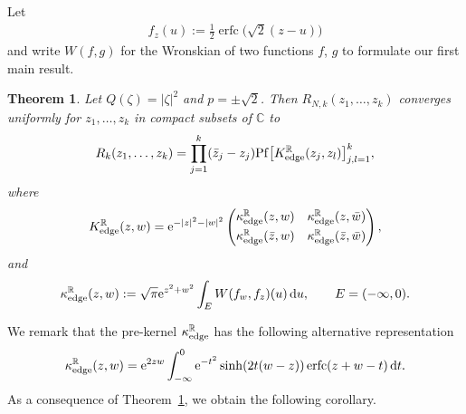 \documentclass[pdftex]{sigma}
\numberwithin{equation}{section}
\newtheorem{Theorem}{Theorem}[section]
\newcommand{\erfc}{\operatorname{erfc}}
\newcommand{\R}{{\mathbb R}}
\newcommand{\C}{{\mathbb C}}
\newcommand{\1}{\chi}
\newcommand{\Pf}{{\operatorname{Pf}}}
\begin{document}
Let
\begin{gather} \label{f_z(u)}
	f_z(u):=\tfrac12 \erfc\big( \sqrt{2}(z-u) \big)
\end{gather}
and write $W(f,g)$ for the Wronskian of two functions $f$, $g$ to formulate our first main result.

\begin{Theorem} \label{Thm_edge kernel}
	Let $Q(\zeta)=|\zeta|^2$ and $p=\pm \sqrt{2}$.
Then $R_{N,k}(z_1,\dots, z_k)$ converges uniformly for $z_1,\dots, z_k$ in compact subsets of $\C$ to
	\begin{gather*}
		R_k(z_1,\dots, z_k)= \prod_{j=1}^{k} ( \bar{z}_j-z_j ) \Pf \big[ K_{{\rm edge}}^{\R}(z_j,z_l) \big]_{ j,l=1 }^k,
	\end{gather*}
	where
	\begin{gather*} %
		K_{{\rm edge}}^\R(z,w)={\rm e}^{-|z|^2-|w|^2}
		\begin{pmatrix}
			\kappa_{{\rm edge}}^\R (z,w) & \kappa_{{\rm edge}}^\R (z,\bar{w})
			\vspace{1mm}\\
			\kappa_{{\rm edge}}^\R (\bar{z},w) & \kappa_{{\rm edge}}^\R (\bar{z},\bar{w})
		\end{pmatrix},
	\end{gather*}
	and
	\begin{gather} \label{kappa edge}
		\kappa_{{\rm edge}}^\R(z,w)
		:= \sqrt{\pi} {\rm e}^{z^2+w^2} \int_{E} W(f_w,f_z)(u) \, {\rm d}u, \qquad E=(-\infty,0).
	\end{gather}
\end{Theorem}

We remark that the pre-kernel $	\kappa_{{\rm edge}}^\R$ has the following alternative representation
\begin{gather*}
	\kappa_{{\rm edge}}^\R(z,w)={\rm e}^{2zw} \int_{-\infty}^{0} {\rm e}^{-t^2} \sinh( 2t(w-z) ) \erfc(z+w-t)\,{\rm d}t.
\end{gather*}
As a consequence of Theorem~\ref{Thm_edge kernel}, we obtain the following corollary.
\end{document}

